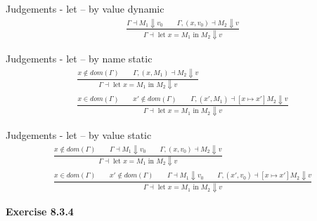 \documentclass[12pt,letterpaper]{article}
\newcommand{\hwSect}[1] {\noindent\large\bf#1\rm\normalsize}
\newcommand{\lets}[2]{\text{ let }x=#1\text{ in }#2}
\begin{document}
Judgements - let -- by value dynamic
\begin{eqnarray*}
\frac{\Gamma \dashv M_1 \Downarrow v_0 \qquad \Gamma,(x,v_0) \dashv M_2 \Downarrow v}{\Gamma \dashv \lets{M_1}{M_2} \Downarrow v}
\end{eqnarray*}


Judgements - let -- by name static
\begin{eqnarray*}
\frac{x\not\in dom(\Gamma) \qquad \Gamma,(x,M_1) \dashv M_2 \Downarrow v}{\Gamma \dashv \lets{M_1}{M_2} \Downarrow v} \\
\frac{x\in dom(\Gamma) \qquad x'\not\in dom(\Gamma) \qquad \Gamma,(x',M_1) \dashv [x \mapsto x']M_2 \Downarrow v}{\Gamma \dashv \lets{M_1}{M_2} \Downarrow v}
\end{eqnarray*}

Judgements - let -- by value static
\begin{eqnarray*}
\frac{x\not\in dom(\Gamma) \qquad \Gamma \dashv M_1 \Downarrow v_0 \qquad \Gamma,(x,v_0) \dashv M_2 \Downarrow v}{\Gamma \dashv \lets{M_1}{M_2} \Downarrow v} \\
\frac{x\in dom(\Gamma) \qquad x'\not\in dom(\Gamma) \qquad \Gamma \dashv M_1 \Downarrow v_0 \qquad \Gamma,(x',v_0) \dashv [x \mapsto x']M_2 \Downarrow v}{\Gamma \dashv \lets{M_1}{M_2} \Downarrow v}
\end{eqnarray*}


\hwSect{Exercise 8.3.4}\\
\end{document}
